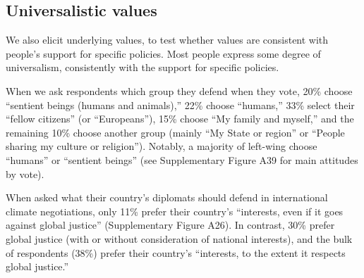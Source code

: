 \subsection*{Universalistic values}\label{subsec:universalistic}

We also elicit underlying values, to test whether values are consistent with people's support for specific policies. Most people express some degree of universalism, consistently with the support for specific policies. %

When we ask respondents which group they defend when they vote, %
20\% choose ``sentient beings (humans and animals),'' 22\% choose ``humans,'' 33\% select their ``fellow citizens'' (or ``Europeans''), 15\% choose ``My family and myself,'' and the remaining 10\% choose another group (mainly ``My State or region'' or ``People sharing my culture or religion''). 
Notably, a majority of left-wing choose ``humans'' or ``sentient beings'' 
(see Supplementary Figure A39 for main attitudes by vote).%

When asked what their country's diplomats should defend in international climate negotiations, only 11\% prefer their country's ``interests, even if it goes against global justice'' (Supplementary Figure A26). In contrast, 30\% prefer global justice (with or without consideration of national interests), and the bulk of respondents (38\%) prefer their country's ``interests, to the extent it respects global justice.''

